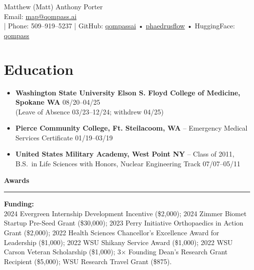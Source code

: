 \documentclass[9pt,a4paper]{article}
\newcommand{\sectionline}{%
  \nointerlineskip
  \vspace{0.25em}%
  \hspace*{-\hoffset}\hspace*{-\oddsidemargin}%
  \rule{\dimexpr\textwidth+\hoffset+\oddsidemargin\relax}{0.4pt}%
  \vspace{0.4em}%
}
\newcommand{\centersection}[1]{%
  \vspace{0.6em}%
  \begin{center}
    \large\bfseries #1%
  \end{center}
  \sectionline
}
\begin{document}
\begin{center}
    {\Huge Matthew (Matt) Anthony Porter}\\[4pt]
    Email: \href{mailto:map@qompass.ai}{map@qompass.ai}\\[2pt]
    \quad|\quad
    Phone: 509--919--5237
    \quad|\quad
    GitHub: \href{https://github.com/qompassai}{qompassai} \quad•\quad
    \href{https://github.com/phaedrusflow}{phaedrusflow} \quad•\quad
    HuggingFace: \href{https://huggingface.co/qompass}{qompass}
\end{center}

\vspace{0.7em}

\section*{Education}

\begin{itemize}[leftmargin=*]
  \item \textbf{Washington State University Elson S. Floyd College of Medicine, Spokane WA} \hfill 08/20--04/25\\
  (Leave of Absence 03/23--12/24; withdrew 04/25)

  \item \textbf{Pierce Community College, Ft. Steilacoom, WA} -- Emergency Medical Services Certificate \hfill 01/19--03/19

  \item \textbf{United States Military Academy, West Point NY} -- Class of 2011, B.S.\ in Life Sciences with Honors, Nuclear Engineering Track \hfill 07/07--05/11
\end{itemize}

\centersection{Awards}

\textbf{Funding:}\\
2024 Evergreen Internship Development Incentive (\$2{,}000);
2024 Zimmer Biomet Startup Pre-Seed Grant (\$30{,}000);
2023 Perry Initiative Orthopaedics in Action Grant (\$2{,}000);
2022 Health Sciences Chancellor’s Excellence Award for Leadership (\$1{,}000);
2022 WSU Shikany Service Award (\$1{,}000);
2022 WSU Carson Veteran Scholarship (\$1{,}000);
3$\times$ Founding Dean's Research Grant Recipient (\$5{,}000);
WSU Research Travel Grant (\$875).
\end{document}

